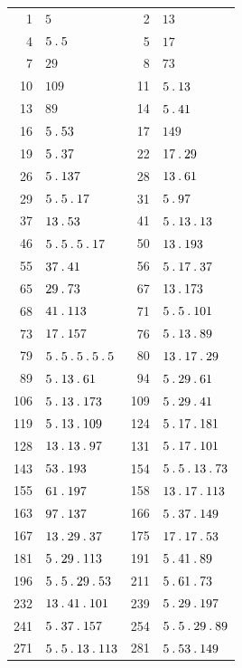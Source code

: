 \begin{longtable}{@{}r|l@{\qquad}r|l@{}}
1 & $5$ & 2 & $13$\\
4 & $5\mathbin{.} 5$ & 5 & $17$\\
7 & $29$ & 8 & $73$\\
10 & $109$ & 11 & $5\mathbin{.} 13$\\
13 & $89$ & 14 & $5\mathbin{.} 41$\\
16 & $5\mathbin{.} 53$ & 17 & $149$\\
19 & $5\mathbin{.} 37$ & 22 & $17\mathbin{.} 29$\\
26 & $5\mathbin{.} 137$ & 28 & $13\mathbin{.} 61$\\
29 & $5\mathbin{.} 5\mathbin{.} 17$ & 31 & $5\mathbin{.} 97$\\
37 & $13\mathbin{.} 53$ & 41 & $5\mathbin{.} 13\mathbin{.} 13$\\
46 & $5\mathbin{.} 5\mathbin{.} 5\mathbin{.} 17$ & 50 & $13\mathbin{.} 193$\\
55 & $37\mathbin{.} 41$ & 56 & $5\mathbin{.} 17\mathbin{.} 37$\\
65 & $29\mathbin{.} 73$ & 67 & $13\mathbin{.} 173$\\
68 & $41\mathbin{.} 113$ & 71 & $5\mathbin{.} 5\mathbin{.} 101$\\
73 & $17\mathbin{.} 157$ & 76 & $5\mathbin{.} 13\mathbin{.} 89$\\
79 & $5\mathbin{.} 5\mathbin{.} 5\mathbin{.} 5\mathbin{.} 5$ & 80 & $13\mathbin{.} 17\mathbin{.} 29$\\
89 & $5\mathbin{.} 13\mathbin{.} 61$ & 94 & $5\mathbin{.} 29\mathbin{.} 61$\\
106 & $5\mathbin{.} 13\mathbin{.} 173$ & 109 & $5\mathbin{.} 29\mathbin{.} 41$\\
119 & $5\mathbin{.} 13\mathbin{.} 109$ & 124 & $5\mathbin{.} 17\mathbin{.} 181$\\
128 & $13\mathbin{.} 13\mathbin{.} 97$ & 131 & $5\mathbin{.} 17\mathbin{.} 101$\\
143 & $53\mathbin{.} 193$ & 154 & $5\mathbin{.} 5\mathbin{.} 13\mathbin{.} 73$\\
155 & $61\mathbin{.} 197$ & 158 & $13\mathbin{.} 17\mathbin{.} 113$\\
163 & $97\mathbin{.} 137$ & 166 & $5\mathbin{.} 37\mathbin{.} 149$\\
167 & $13\mathbin{.} 29\mathbin{.} 37$ & 175 & $17\mathbin{.} 17\mathbin{.} 53$\\
181 & $5\mathbin{.} 29\mathbin{.} 113$ & 191 & $5\mathbin{.} 41\mathbin{.} 89$\\
196 & $5\mathbin{.} 5\mathbin{.} 29\mathbin{.} 53$ & 211 & $5\mathbin{.} 61\mathbin{.} 73$\\
232 & $13\mathbin{.} 41\mathbin{.} 101$ & 239 & $5\mathbin{.} 29\mathbin{.} 197$\\
241 & $5\mathbin{.} 37\mathbin{.} 157$ & 254 & $5\mathbin{.} 5\mathbin{.} 29\mathbin{.} 89$\\
271 & $5\mathbin{.} 5\mathbin{.} 13\mathbin{.} 113$ & 281 & $5\mathbin{.} 53\mathbin{.} 149$\\

\end{longtable}
